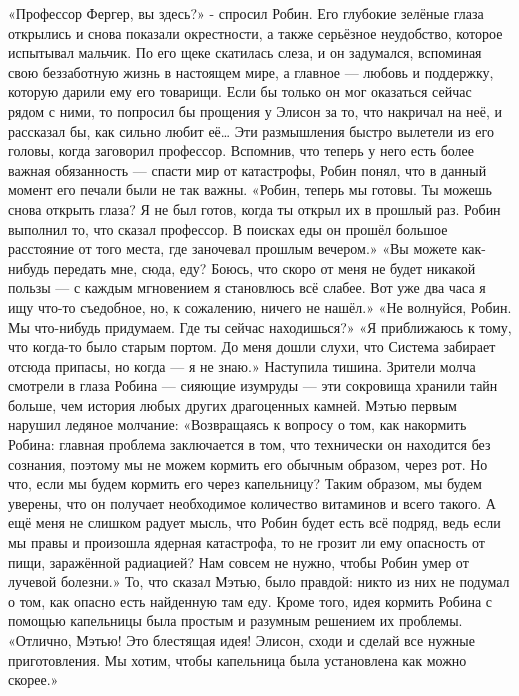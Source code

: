 \documentclass[a4paper,12pt]{book}
\begin{document}
	«Профессор Фергер, вы здесь?» - спросил Робин. Его глубокие зелёные глаза открылись и снова показали окрестности, а также серьёзное неудобство, которое испытывал мальчик. По его щеке скатилась слеза, и он задумался, вспоминая свою беззаботную жизнь в настоящем мире, а главное — любовь и поддержку, которую дарили ему его товарищи. Если бы только он мог оказаться сейчас рядом с ними, то попросил бы прощения у Элисон за то, что накричал на неё, и рассказал бы, как сильно любит её…
	Эти размышления быстро вылетели из его головы, когда заговорил профессор. Вспомнив, что теперь у него есть более важная обязанность — спасти мир от катастрофы, Робин понял, что в данный момент его печали были не так важны.
	«Робин, теперь мы готовы. Ты можешь снова открыть глаза? Я не был готов, когда ты открыл их в прошлый раз. Робин выполнил то, что сказал профессор. В поисках еды он прошёл большое расстояние от того места, где заночевал прошлым вечером.»
	«Вы можете как-нибудь передать мне, сюда, еду? Боюсь, что скоро от меня не будет никакой пользы — с каждым мгновением я становлюсь всё слабее. Вот уже два часа я ищу что-то съедобное, но, к сожалению, ничего не нашёл.»
	«Не волнуйся, Робин. Мы что-нибудь придумаем. Где ты сейчас находишься?»
	«Я приближаюсь к тому, что когда-то было старым портом. До меня дошли слухи, что Система забирает отсюда припасы, но когда — я не знаю.»
	Наступила тишина. Зрители молча смотрели в глаза Робина — сияющие изумруды — эти сокровища хранили тайн больше, чем история любых других драгоценных камней.
	Мэтью первым нарушил ледяное молчание:
	«Возвращаясь к вопросу о том, как накормить Робина: главная проблема заключается в том, что технически он находится без сознания, поэтому мы не можем кормить его обычным образом, через рот. Но что, если мы будем кормить его через капельницу? Таким образом, мы будем уверены, что он получает необходимое количество витаминов и всего такого. А ещё меня не слишком радует мысль, что Робин будет есть всё подряд, ведь если мы правы и произошла ядерная катастрофа, то не грозит ли ему опасность от пищи, заражённой радиацией? Нам совсем не нужно, чтобы Робин умер от лучевой болезни.»
	То, что сказал Мэтью, было правдой: никто из них не подумал о том, как опасно есть найденную там еду. Кроме того, идея кормить Робина с помощью капельницы была простым и разумным решением их проблемы.
	«Отлично, Мэтью! Это блестящая идея! Элисон, сходи и сделай все нужные приготовления. Мы хотим, чтобы капельница была установлена как можно скорее.»
\end{document}
